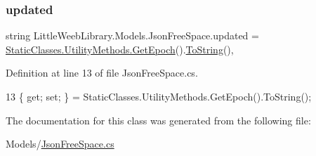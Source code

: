 \subsubsection{\texorpdfstring{updated}{updated}}
{\footnotesize\ttfamily string Little\+Weeb\+Library.\+Models.\+Json\+Free\+Space.\+updated = \mbox{\hyperlink{class_little_weeb_library_1_1_static_classes_1_1_utility_methods_a12336d9e64983ddabaad8950486fafb2}{Static\+Classes.\+Utility\+Methods.\+Get\+Epoch}}().\mbox{\hyperlink{class_little_weeb_library_1_1_models_1_1_json_free_space_ab23fb33c2e1990fc09fb171193bee852}{To\+String}}()\hspace{0.3cm}{\ttfamily [get]}, {\ttfamily [set]}}



Definition at line 13 of file Json\+Free\+Space.\+cs.


\begin{DoxyCode}
13 \{ \textcolor{keyword}{get}; \textcolor{keyword}{set}; \} = StaticClasses.UtilityMethods.GetEpoch().ToString();
\end{DoxyCode}


The documentation for this class was generated from the following file\+:\begin{DoxyCompactItemize}
\item 
Models/\mbox{\hyperlink{_json_free_space_8cs}{Json\+Free\+Space.\+cs}}\end{DoxyCompactItemize}
